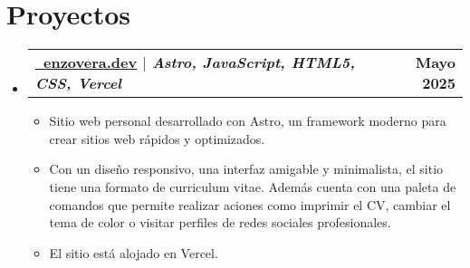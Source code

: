 \documentclass[letterpaper,11pt]{article}
\makeatletter
\newcommand{\resumeItem}[1]{
  \item\small{
    #1 
  }
}
\newcommand{\resumeProjectHeading}[2]{
    \item
    \begin{tabular*}{1.001\textwidth}{l@{\extracolsep{\fill}}r}
      \small#1 & \textbf{\small #2}\\
    \end{tabular*}\vspace{-7pt}
}
\newcommand{\resumeSubHeadingListStart}{\begin{itemize}[leftmargin=0.0in, label={}]}
\newcommand{\resumeSubHeadingListEnd}{\end{itemize}}
\newcommand{\resumeItemListStart}{\begin{itemize}[leftmargin=3em]}
\newcommand{\resumeItemListEnd}{\end{itemize}\vspace{1pt}}
\makeatother
\begin{document}
\section{Proyectos}
    \vspace{-5pt}
    \resumeSubHeadingListStart
      \resumeProjectHeading
          {\textbf{\href{https://enzovera.dev/}{\raisebox{-0.2\height}\faDesktop\ \underline{enzovera.dev}} $|$ \emph{Astro, JavaScript, HTML5, CSS, Vercel}}}{Mayo 2025}
          \resumeItemListStart
            \resumeItem{Sitio web personal desarrollado con Astro, un framework moderno para crear sitios web rápidos y optimizados.}
            \resumeItem{Con un diseño responsivo, una interfaz amigable y minimalista, el sitio tiene una formato de curriculum vitae. Además cuenta con una paleta de comandos que permite realizar aciones como imprimir el CV, cambiar el tema de color o visitar perfiles de redes sociales profesionales.}
            \resumeItem{El sitio está alojado en Vercel.}
          \resumeItemListEnd
          \vspace{-13pt}
    
    \resumeSubHeadingListEnd
\vspace{-6pt}
\end{document}
